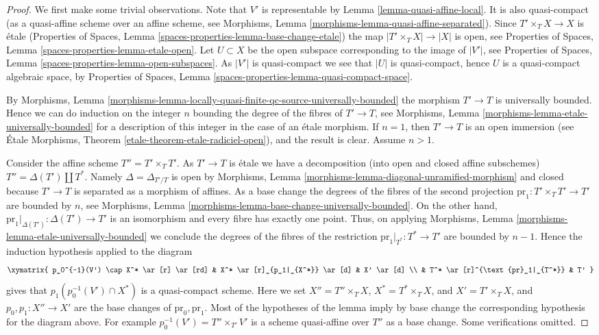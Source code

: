 \begin{proof}
We first make some trivial observations.
Note that $V'$ is representable by Lemma \ref{lemma-quasi-affine-local}.
It is also quasi-compact (as a quasi-affine scheme over an affine scheme, see
Morphisms, Lemma \ref{morphisms-lemma-quasi-affine-separated}).
Since $T' \times_T X \to X$ is \'etale
(Properties of Spaces, Lemma \ref{spaces-properties-lemma-base-change-etale})
the map $|T' \times_T X| \to |X|$ is open, see
Properties of Spaces, Lemma \ref{spaces-properties-lemma-etale-open}.
Let $U \subset X$ be the open subspace corresponding to the image of
$|V'|$, see
Properties of Spaces, Lemma \ref{spaces-properties-lemma-open-subspaces}.
As $|V'|$ is quasi-compact we see that $|U|$ is quasi-compact, hence
$U$ is a quasi-compact algebraic space, by
Properties of Spaces, Lemma \ref{spaces-properties-lemma-quasi-compact-space}.

\medskip\noindent
By
Morphisms,
Lemma \ref{morphisms-lemma-locally-quasi-finite-qc-source-universally-bounded}
the morphism $T' \to T$ is universally bounded. Hence we can do induction on
the integer $n$ bounding the degree of the fibres of $T' \to T$, see
Morphisms, Lemma \ref{morphisms-lemma-etale-universally-bounded}
for a description of this integer in the case of an \'etale morphism.
If $n = 1$, then $T' \to T$ is an open immersion (see
\'Etale Morphisms, Theorem \ref{etale-theorem-etale-radiciel-open}),
and the result is clear. Assume $n > 1$.

\medskip\noindent
Consider the affine scheme $T'' = T' \times_T T'$.
As $T' \to T$ is \'etale we have a decomposition (into open and closed affine
subschemes) $T'' = \Delta(T') \amalg T^*$. Namely $\Delta = \Delta_{T'/T}$
is open by
Morphisms, Lemma \ref{morphisms-lemma-diagonal-unramified-morphism}
and closed because $T' \to T$ is separated as a morphism of affines.
As a base change the degrees of the fibres of the second projection
$\text{pr}_1 : T' \times_T T' \to T'$ are bounded by $n$, see
Morphisms, Lemma \ref{morphisms-lemma-base-change-universally-bounded}.
On the other hand, $\text{pr}_1|_{\Delta(T')} : \Delta(T') \to T'$ is
an isomorphism and every fibre has exactly one point.
Thus, on applying
Morphisms, Lemma \ref{morphisms-lemma-etale-universally-bounded}
we conclude the degrees of the fibres of the restriction
$\text{pr}_1|_{T^*} : T^* \to T'$ are bounded by $n - 1$.
Hence the induction hypothesis applied to the diagram
$$
\xymatrix{
p_0^{-1}(V') \cap X^* \ar[r] \ar[rd] &
X^* \ar[r]_{p_1|_{X^*}} \ar[d] &
X' \ar[d] \\
& T^* \ar[r]^{\text{pr}_1|_{T^*}} & T'
}
$$
gives that $p_1(p_0^{-1}(V') \cap X^*)$
is a quasi-compact scheme. Here we set
$X'' = T'' \times_T X$, $X^* = T^* \times_T X$, and $X' = T' \times_T X$,
and $p_0, p_1 : X'' \to X'$ are the base changes of $\text{pr}_0, \text{pr}_1$.
Most of the hypotheses of the lemma imply
by base change the corresponding hypothesis for the diagram above.
For example $p_0^{-1}(V') = T'' \times_{T'} V'$
is a scheme quasi-affine over $T''$ as a base change. Some
verifications omitted.


\end{proof}
